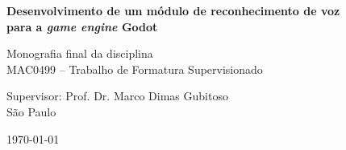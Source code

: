 \newpage
\thispagestyle{empty}
  \begin{center}
    \vspace*{2.3 cm}
    \textbf{\large{Desenvolvimento de um módulo de reconhecimento de voz \\[0.5\baselineskip]
    para a \textit{game engine} Godot}}
    \vspace*{2 cm}
  \end{center}

  \vskip 2cm

  \begin{flushright}
    Monografia final da disciplina \\
    MAC0499 -- Trabalho de Formatura Supervisionado
  \end{flushright}

  \vskip 5cm

  \begin{center}
  Supervisor: Prof. Dr. Marco Dimas Gubitoso \\

  \vskip 5cm
  \normalsize{São Paulo}

  \today
  \end{center}
\pagebreak
